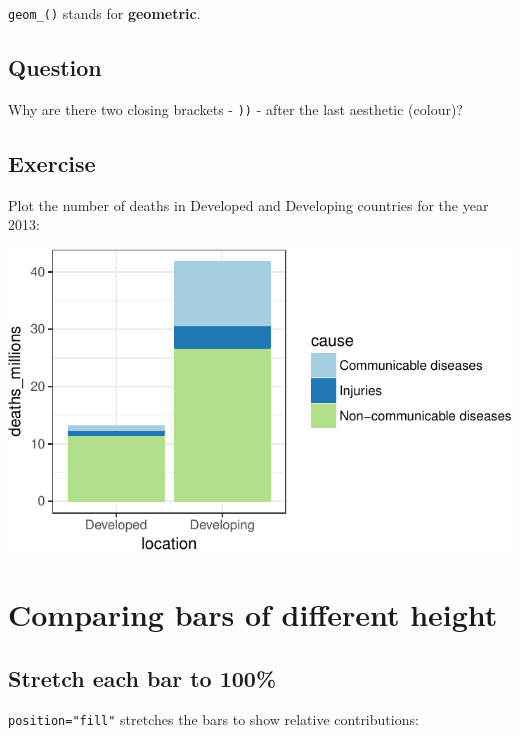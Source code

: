 \documentclass[12pt,]{krantz}
\makeatletter
\newenvironment{Shaded}{\begin{snugshade}}{\end{snugshade}}
\newcommand{\DataTypeTok}[1]{\textcolor[rgb]{0.13,0.29,0.53}{#1}}
\newcommand{\KeywordTok}[1]{\textcolor[rgb]{0.13,0.29,0.53}{\textbf{#1}}}
\newcommand{\NormalTok}[1]{#1}
\newcommand{\OperatorTok}[1]{\textcolor[rgb]{0.81,0.36,0.00}{\textbf{#1}}}
\newcommand{\StringTok}[1]{\textcolor[rgb]{0.31,0.60,0.02}{#1}}
\newenvironment{kframe}{%
\medskip{}
\setlength{\fboxsep}{.8em}
 \def\at@end@of@kframe{}%
 \ifinner\ifhmode%
  \def\at@end@of@kframe{\end{minipage}}%
  \begin{minipage}{\columnwidth}%
 \fi\fi%
 \def\FrameCommand##1{\hskip\@totalleftmargin \hskip-\fboxsep
 \colorbox{shadecolor}{##1}\hskip-\fboxsep
     \hskip-\linewidth \hskip-\@totalleftmargin \hskip\columnwidth}%
 \MakeFramed {\advance\hsize-\width
   \@totalleftmargin\z@ \linewidth\hsize
   \@setminipage}}%
 {\par\unskip\endMakeFramed%
 \at@end@of@kframe}
\renewenvironment{Shaded}{\begin{kframe}}{\end{kframe}}
\theoremstyle{definition}
\theoremstyle{definition}
\theoremstyle{definition}
\theoremstyle{remark}
\makeatother
\begin{document}
\texttt{geom\_()} stands for \textbf{geometric}.

\hypertarget{question}{%
\subsection{Question}\label{question}}

Why are there two closing brackets - \texttt{))} - after the last
aesthetic (colour)?

\hypertarget{exercise}{%
\subsection{Exercise}\label{exercise}}

Plot the number of deaths in Developed and Developing countries for the
year 2013:

\includegraphics{01_first_interaction_files/figure-latex/unnamed-chunk-3-1.pdf}

\newpage

\hypertarget{comparing-bars-of-different-height}{%
\section{Comparing bars of different
height}\label{comparing-bars-of-different-height}}

\hypertarget{stretch-each-bar-to-100}{%
\subsection{Stretch each bar to 100\%}\label{stretch-each-bar-to-100}}

\texttt{position="fill"} stretches the bars to show relative
contributions:

\begin{Shaded}
\end{Shaded}
\end{document}
